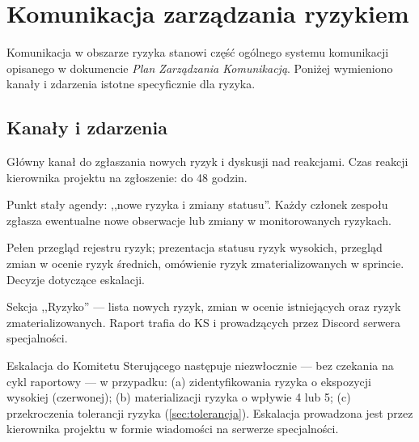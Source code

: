 \documentclass[11pt,a4paper]{article}
\begin{document}
	\section{Komunikacja zarządzania ryzykiem}\label{sec:komunikacja}
	
	Komunikacja w obszarze ryzyka stanowi część ogólnego systemu komunikacji opisanego w
	dokumencie \textit{Plan Zarządzania Komunikacją}. Poniżej wymieniono kanały i zdarzenia
	istotne specyficznie dla ryzyka.
	
	\subsection{Kanały i zdarzenia}
	\begin{description}[style=nextline]
		\item[Kanał \texttt{\#ryzyka} na Discord]
		Główny kanał do zgłaszania nowych ryzyk i dyskusji nad reakcjami. Czas reakcji kierownika projektu na zgłoszenie: do 48 godzin.
		
		\item[Stand-up tygodniowy]
		Punkt stały agendy: ,,nowe ryzyka i zmiany statusu''. Każdy członek zespołu zgłasza ewentualne nowe obserwacje lub zmiany w monitorowanych ryzykach.
		
		\item[Przegląd końca sprintu (z udziałem KS)]
		Pełen przegląd rejestru ryzyk; prezentacja statusu ryzyk wysokich, przegląd zmian w ocenie ryzyk średnich, omówienie ryzyk zmaterializowanych w sprincie. Decyzje dotyczące eskalacji.
		
		\item[Raport końca sprintu]
		Sekcja ,,Ryzyko'' --- lista nowych ryzyk, zmian w ocenie istniejących oraz ryzyk zmaterializowanych. Raport trafia do KS i prowadzących przez Discord serwera specjalności.
		
		\item[Eskalacja]
		Eskalacja do Komitetu Sterującego następuje niezwłocznie --- bez czekania na cykl raportowy --- w przypadku: (a) zidentyfikowania ryzyka o ekspozycji wysokiej (czerwonej); (b) materializacji ryzyka o wpływie 4 lub 5; (c) przekroczenia tolerancji ryzyka (\cref{sec:tolerancja}). Eskalacja prowadzona jest przez kierownika projektu w formie wiadomości na serwerze specjalności.
	\end{description}
	
\end{document}
